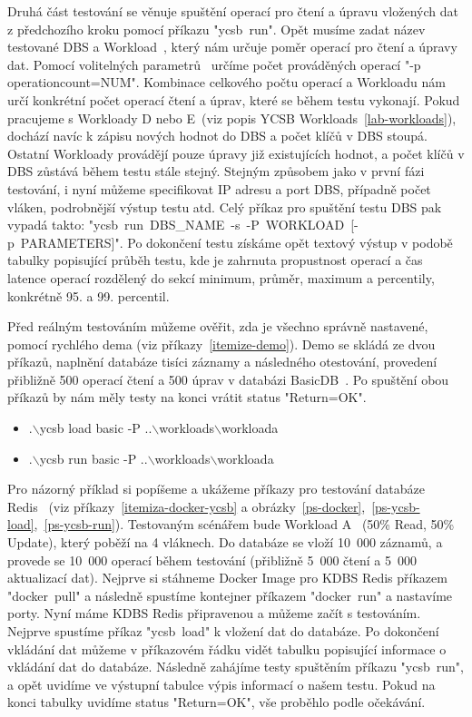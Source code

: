 \documentclass[czech,master,dept460,male,csharp,cpdeclaration]{diploma}
\begin{document}
	Druhá část testování se věnuje spuštění operací pro čtení a úpravu vložených dat z předchozího kroku pomocí příkazu "ycsb~run". Opět musíme zadat název testované DBS a Workload~\cite{workloads}, který nám určuje poměr operací pro čtení a úpravy dat. Pomocí volitelných parametrů~\cite{ycsb-properties} určíme počet prováděných operací "-p operationcount=NUM". Kombinace celkového počtu operací a Workloadu nám určí konkrétní počet operací čtení a úprav, které se během testu vykonají. Pokud pracujeme s Workloady D nebo E~(viz popis YCSB Workloads~\ref{lab-workloads}), dochází navíc k zápisu nových hodnot do DBS a počet klíčů v DBS stoupá. Ostatní Workloady provádějí pouze úpravy již existujících hodnot, a počet klíčů v DBS zůstává během testu stále stejný. Stejným způsobem jako v první fázi testování, i nyní můžeme specifikovat IP adresu a port DBS, případně počet vláken, podrobnější výstup testu atd. Celý příkaz pro spuštění testu DBS pak vypadá takto: "ycsb~run~DBS\_NAME~-s~-P~WORKLOAD~[-p~PARAMETERS]". Po dokončení testu získáme opět textový výstup v podobě tabulky popisující průběh testu, kde je zahrnuta propustnost operací a čas latence operací rozdělený do sekcí minimum, průměr, maximum a percentily, konkrétně 95. a 99. percentil.
	
	Před reálným testováním můžeme ověřit, zda je všechno správně nastavené, pomocí rychlého dema (viz příkazy~\ref{itemize-demo}). Demo se skládá ze dvou příkazů, naplnění databáze tisíci záznamy a následného otestování, provedení přibližně 500 operací čtení a 500 úprav v databázi BasicDB~\cite{basicdb}. Po spuštění obou příkazů by nám měly testy na konci vrátit status "Return=OK".
	
	\begin{itemize}\label{itemize-demo}
		\item .$\backslash$ycsb load basic -P ..$\backslash$workloads$\backslash$workloada
		\item .$\backslash$ycsb run basic -P ..$\backslash$workloads$\backslash$workloada
	\end{itemize}
	
	Pro názorný příklad si popíšeme a ukážeme příkazy pro testování databáze Redis~\cite{redis} (viz příkazy~\ref{itemiza-docker-ycsb} a obrázky~\ref{ps-docker},~\ref{ps-ycsb-load},~\ref{ps-ycsb-run}). Testovaným scénářem bude Workload A~\cite{workloads} (50\% Read, 50\% Update), který poběží na 4 vláknech. Do databáze se vloží 10~000 záznamů, a provede se 10~000 operací během testování (přibližně 5~000 čtení a 5~000 aktualizací dat). Nejprve si stáhneme Docker Image pro KDBS Redis příkazem "docker~pull" a následně spustíme kontejner příkazem "docker~run" a nastavíme porty. Nyní máme KDBS Redis připravenou a můžeme začít s testováním. Nejprve spustíme příkaz "ycsb~load" k vložení dat do databáze. Po dokončení vkládání dat můžeme v příkazovém řádku vidět tabulku popisující informace o vkládání dat do databáze. Následně zahájíme testy spuštěním příkazu "ycsb~run", a opět uvidíme ve výstupní tabulce výpis informací o našem testu. Pokud na konci tabulky uvidíme status "Return=OK", vše proběhlo podle očekávání.
	
\end{document}
